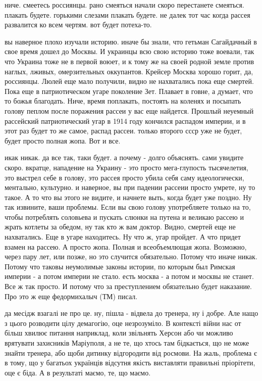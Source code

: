 ниче. смеетесь россиянцы. рано смеяться начали скоро перестанете смеяться.
плакать будете. горькими слезами плакать будете. не далек тот час когда рассея
развалится ко всем чертям. вот будет потеха-то.

вы наверное плохо изучали историю. иначе бы знали, что гетьман Сагайдачный в
свое время дошел до Москвы. И украинцы всю свою историю тоже воевали, так что
Украина тоже не в первой воюет, и к тому же на своей родной земле против
наглых, лживых, омерзительных оккупантов. Крейсер Москва хорошо горит, да,
россиянцы. Люлей еще мало получили, видно не нахватались пока еще смертей. Пока
еще в патриотическом угаре поколение Зет. Плавает в говне, а думает, что то
божья благодать. Ниче, время поплакать, постоять на коленях и посыпать голову
пеплом после поражения рассеи у вас еще найдется. Прошлый неуемный рассейский
патриотический угар в 1914 году кончился распадом империи, и в этот раз будет
то же самое, распад рассеи. только второго ссср уже не будет, будет просто
полная жопа. Вот и все.

икак никак. да все так, таки будет. а почему - долго объяснять. сами увидите
скоро. вкратце, нападение на Украину - это просто мега-глупость тысячелетия,
это выстрел себе в голову, это рассея просто убила себя саму идеологически,
ментально, культурно. и наверное, вы при падении рассеии просто умрете, ну то
такое. А то что вы этого не видите, и начнете выть, когда будет уже поздно. Ну
так извините, ваши проблемы. Если вы свою голову употребляете только на то,
чтобы потреблять соловьева и пускать слюнки на путена и великаю рассею и жрать
котлеты за обедом, ну так кто ж вам доктор. Видно, смертей еще не нахватались.
Еще в угаре находитесь. Ну что ж, угар пройдет. А что придет взамен на рассею.
А просто жопа. Полная и всеобъемлющая жопа. Возможно, через пару лет, или
позже, но это случится обязательно. Потому что иначе никак. Потому что таковы
неумолимые законы истории, по которым был Римская империи - а потом империи не
стало. есть москва - а потом и москвы не станет. Все ж так просто. И потому что
за преступлением обязательно будет наказание. Про это ж еще федормихалыч (ТМ)
писал.

да месідж взагалі не про це. ну, пішла - відвела до тренера, ну і добре. Але
нащо з цього розводити цілу демагогію, оце незрозуміло. В контексті війни нас
от більш хвилює питання наприклад, коли звільнять Херсон або чи можливо
врятувати захисників Маріуполя, а не те, що хтось там бідкається, що не може
знайти тренера, або щоби дитинку відгородити від росмови. На жаль, проблема є в
тому, що у багатьох українців відсутня якість виставляти правильні пріорітети,
оце є біда. А в результаті маємо, те, що маємо.

